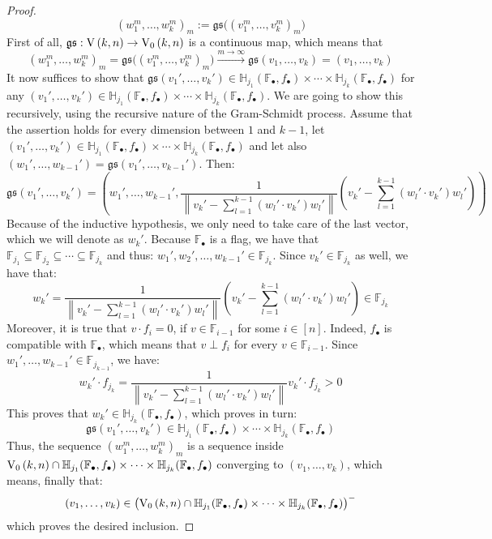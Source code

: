 \begin{proof}
\[{(w_1^m,\ldots,w_k^m)}_m:=\mathfrak{gs}\big({(v_1^m,\ldots,v_k^m)}_m\big)\]
First of all, $\mathfrak{gs}:\St{k}{n}\to\StO{k}{n}$ is a continuous map, which means that
\[{(w_1^m,\ldots,w_k^m)}_m=\mathfrak{gs}\big({(v_1^m,\ldots,v_k^m)}_m\big)\overset{m\to\infty}{\to}\mathfrak{gs}(v_1,\ldots,v_k)=(v_1,\ldots,v_k)\]
It now suffices to show that $\mathfrak{gs}(v_1',\ldots,v_k')\in\mathbb{H}_{j_1}(\mathbb{F}_{\bullet},f_{\bullet})\times\cdots\times\mathbb{H}_{j_k}(\mathbb{F}_{\bullet},f_{\bullet})$ for any $(v_1',\ldots,v_k')\in\mathbb{H}_{j_1}(\mathbb{F}_{\bullet},f_{\bullet})\times\cdots\times\mathbb{H}_{j_k}(\mathbb{F}_{\bullet},f_{\bullet})$. We are going to show this recursively, using the recursive nature of the Gram-Schmidt process. Assume that the assertion holds for every dimension between $1$ and $k-1$, let $(v_1',\ldots,v_k')\in\mathbb{H}_{j_1}(\mathbb{F}_{\bullet},f_{\bullet})\times\cdots\times\mathbb{H}_{j_k}(\mathbb{F}_{\bullet},f_{\bullet})$ and let also $(w_1',\ldots,w_{k-1}')=\mathfrak{gs}(v_1',\ldots,v_{k-1}')$. Then:
\[\mathfrak{gs}(v_1',\ldots,v_k')=\left(w_1',\ldots,w_{k-1}',\frac{1}{\left\|v_k'-\sum_{l=1}^{k-1}(w_l'\cdot v_k')w_l'\right\|}\left(v_k'-\sum_{l=1}^{k-1}(w_l'\cdot v_k')w_l'\right)\right)\]
Because of the inductive hypothesis, we only need to take care of the last vector, which we will denote as $w_k'$. Because $\mathbb{F}_{\bullet}$ is a flag, we have that $\mathbb{F}_{j_1}\subseteq\mathbb{F}_{j_2}\subseteq\cdots\subseteq\mathbb{F}_{j_k}$ and thus: $w_1',w_2',\ldots,w_{k-1}'\in\mathbb{F}_{j_k}$. Since $v_k'\in\mathbb{F}_{j_k}$ as well, we have that:
\[w_k'=\frac{1}{\left\|v_k'-\sum_{l=1}^{k-1}(w_l'\cdot v_k')w_l'\right\|}\left(v_k'-\sum_{l=1}^{k-1}(w_l'\cdot v_k')w_l'\right)\in\mathbb{F}_{j_k}\]
Moreover, it is true that $v\cdot f_i=0$, if $v\in\mathbb{F}_{i-1}$ for some $i\in[n]$. Indeed, $f_{\bullet}$ is compatible with $\mathbb{F}_{\bullet}$, which means that $v\perp f_i$ for every $v\in\mathbb{F}_{i-1}$. Since $w_1',\ldots,w_{k-1}'\in\mathbb{F}_{j_{k-1}}$, we have:
\[w_k'\cdot f_{j_k}=\frac{1}{\left\|v_k'-\sum_{l=1}^{k-1}(w_l'\cdot v_k')w_l'\right\|}v_k'\cdot f_{j_k}>0\]
This proves that $w_k'\in\mathbb{H}_{j_k}(\mathbb{F}_{\bullet},f_{\bullet})$, which proves in turn:
\[\mathfrak{gs}(v_1',\ldots,v_k')\in\mathbb{H}_{j_1}(\mathbb{F}_{\bullet},f_{\bullet})\times\cdots\times\mathbb{H}_{j_k}(\mathbb{F}_{\bullet},f_{\bullet})\]
Thus, the sequence ${(w_1^m,\ldots,w_k^m)}_m$ is a sequence inside $\StO{k}{n}\cap\mathbb{H}_{j_1}(\mathbb{F}_{\bullet},f_{\bullet})\times\cdots\times\mathbb{H}_{j_k}(\mathbb{F}_{\bullet},f_{\bullet})$ converging to $(v_1,\ldots,v_k)$, which means, finally that:
\[(v_1,\ldots,v_k)\in{\big(\StO{k}{n}\cap\mathbb{H}_{j_1}(\mathbb{F}_{\bullet},f_{\bullet})\times\cdots\times\mathbb{H}_{j_k}(\mathbb{F}_{\bullet},f_{\bullet})\big)}^-\]
which proves the desired inclusion.
\end{proof}

